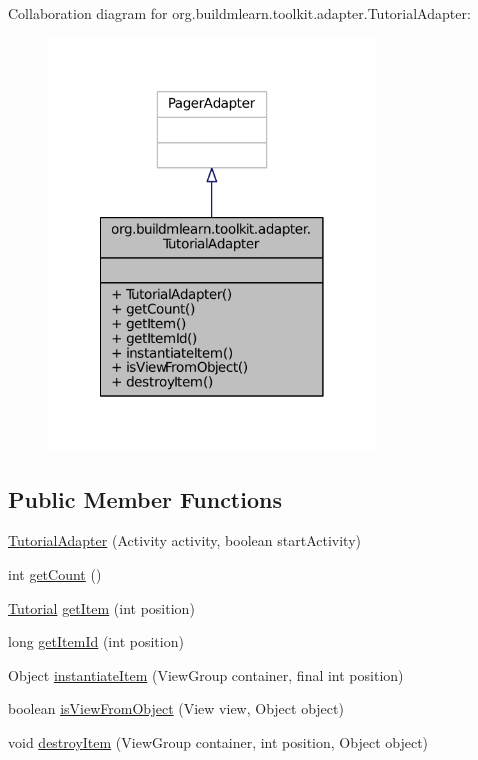 Collaboration diagram for org.\-buildmlearn.\-toolkit.\-adapter.\-Tutorial\-Adapter\-:
\nopagebreak
\begin{figure}[H]
\begin{center}
\leavevmode
\includegraphics[width=246pt]{dc/d8e/classorg_1_1buildmlearn_1_1toolkit_1_1adapter_1_1TutorialAdapter__coll__graph}
\end{center}
\end{figure}
\subsection*{Public Member Functions}
\begin{DoxyCompactItemize}
\item 
\hyperlink{classorg_1_1buildmlearn_1_1toolkit_1_1adapter_1_1TutorialAdapter_ad6e401b96ba7fcde9c0b57a3b9e5f60c}{Tutorial\-Adapter} (Activity activity, boolean start\-Activity)
\item 
int \hyperlink{classorg_1_1buildmlearn_1_1toolkit_1_1adapter_1_1TutorialAdapter_a1ea77519e1257a68116ea93bdf4a7618}{get\-Count} ()
\item 
\hyperlink{enumorg_1_1buildmlearn_1_1toolkit_1_1model_1_1Tutorial}{Tutorial} \hyperlink{classorg_1_1buildmlearn_1_1toolkit_1_1adapter_1_1TutorialAdapter_a2b57538f443c66c7a706128443693eda}{get\-Item} (int position)
\item 
long \hyperlink{classorg_1_1buildmlearn_1_1toolkit_1_1adapter_1_1TutorialAdapter_a78742a37c61010923c051135bdbeef14}{get\-Item\-Id} (int position)
\item 
Object \hyperlink{classorg_1_1buildmlearn_1_1toolkit_1_1adapter_1_1TutorialAdapter_a61e4fd5e541db4d32b4888a2e73b129e}{instantiate\-Item} (View\-Group container, final int position)
\item 
boolean \hyperlink{classorg_1_1buildmlearn_1_1toolkit_1_1adapter_1_1TutorialAdapter_ae8d4ccac4b3da95a24e581b25dd03646}{is\-View\-From\-Object} (View view, Object object)
\item 
void \hyperlink{classorg_1_1buildmlearn_1_1toolkit_1_1adapter_1_1TutorialAdapter_a486ba0a0346f2adf357bf97e57edb9c4}{destroy\-Item} (View\-Group container, int position, Object object)
\end{DoxyCompactItemize}


